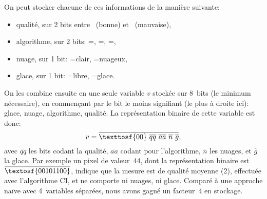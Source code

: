 On peut stocker chacune de ces informations de la manière suivante:
\begin{itemize}
  \item qualité, sur 2 bits entre ~(bonne) et ~(mauvaise),
  \item algorithme, sur 2 bits: =, =, =,
  \item nuage, sur 1 bit: =clair, =nuageux,
  \item glace, sur 1 bit: =libre, =glace.
\end{itemize}

On les combine ensuite en une seule variable \(v\) stockée sur 8~bits (le minimum nécessaire), en commençant par le bit le moins signifiant (le plus à droite ici): glace, nuage, algorithme, qualité.
La représentation binaire de cette variable est donc:
\begin{equation}
  v = \overline{\texttosf{00} \ \overline{qq} \ \overline{aa} \ \overline{n} \ \overline{g}},
\end{equation}
avec \(\overline{qq}\) les bits codant la qualité, \(\overline{aa}\) codant pour l'algorithme, \(\overline{n}\) les nuages, et \(\overline{g}\) la glace.
Par exemple un pixel de valeur~44, dont la représentation binaire est \(\overline{\textosf{00101100}}\), indique que la mesure est de qualité moyenne (2), effectuée avec l'algorithme CI, et ne comporte ni nuages, ni glace.
Comparé à une approche naïve avec 4~variables séparées, nous avons gagné un facteur~4 en stockage.

